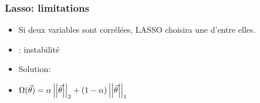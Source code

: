 \begin{frame}
  \frametitle{Lasso: limitations}
  \begin{itemize}
  \item Si deux variables sont corrélées, LASSO choisira une d'entre elles. 
  \item {} : instabilité 
  \item Solution: 
  \item[] $\Omega(\vec{\theta}) = \alpha \left|\left|\vec{\theta}\right|\right|_2 + (1-\alpha) \left|\left|\vec{\theta}\right|\right|_1$
  \end{itemize}

\end{frame}


